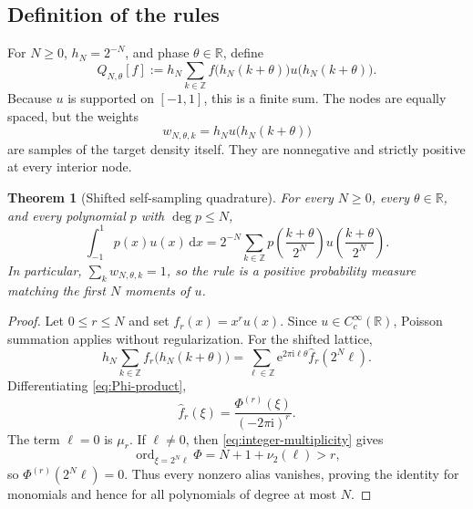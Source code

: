 \documentclass[11pt]{article}
\numberwithin{equation}{section}
\newtheorem{theorem}{Theorem}[section]
\theoremstyle{definition}
\theoremstyle{remark}
\DeclareMathOperator{\ord}{ord}
\newcommand{\R}{\mathbb R}
\newcommand{\Z}{\mathbb Z}
\newcommand{\dd}{\,\mathrm d}
\newcommand{\e}{\mathrm e}
\newcommand{\iu}{\mathrm i}
\begin{document}
\subsection{Definition of the rules}

For $N\ge0$, $h_N=2^{-N}$, and phase $\theta\in\R$, define
\begin{equation}
 Q_{N,\theta}[f]
 :=h_N\sum_{k\in\Z}
 f\bigl(h_N(k+\theta)\bigr)
 u\bigl(h_N(k+\theta)\bigr).
 \label{eq:Q-def}
\end{equation}
Because $u$ is supported on $[-1,1]$, this is a finite sum.  The nodes are equally spaced, but the weights
\begin{equation}
 w_{N,\theta,k}=h_Nu\bigl(h_N(k+\theta)\bigr)
 \label{eq:self-weights}
\end{equation}
are samples of the target density itself.  They are nonnegative and strictly positive at every interior node.

\begin{theorem}[Shifted self-sampling quadrature]
\label{thm:self-sampling}
For every $N\ge0$, every $\theta\in\R$, and every polynomial $p$ with $\deg p\le N$,
\begin{equation}
 \boxed{\displaystyle
 \int_{-1}^{1}p(x)u(x)\dd x
 =2^{-N}\sum_{k\in\Z}
 p\!\left(\frac{k+\theta}{2^N}\right)
 u\!\left(\frac{k+\theta}{2^N}\right).}
 \label{eq:self-sampling-main}
\end{equation}
In particular, $\sum_k w_{N,\theta,k}=1$, so the rule is a positive probability measure matching the first $N$ moments of $u$.
\end{theorem}

\begin{proof}
Let $0\le r\le N$ and set $f_r(x)=x^ru(x)$.  Since $u\in C_c^\infty(\R)$, Poisson summation applies without regularization.  For the shifted lattice,
\begin{equation}
 h_N\sum_{k\in\Z}f_r\bigl(h_N(k+\theta)\bigr)
 =\sum_{\ell\in\Z}\e^{2\pi\iu\ell\theta}
 \widehat f_r(2^N\ell).
 \label{eq:shifted-Poisson}
\end{equation}
Differentiating \eqref{eq:Phi-product},
\begin{equation}
 \widehat f_r(\xi)=\frac{\Phi^{(r)}(\xi)}{(-2\pi\iu)^r}.
 \label{eq:monomial-transform}
\end{equation}
The term $\ell=0$ is $\mu_r$.  If $\ell\ne0$, then \eqref{eq:integer-multiplicity} gives
\[
 \ord_{\xi=2^N\ell}\Phi
 =N+1+\nu_2(\ell)>r,
\]
so $\Phi^{(r)}(2^N\ell)=0$.  Thus every nonzero alias vanishes, proving the identity for monomials and hence for all polynomials of degree at most $N$.
\end{proof}
\end{document}

